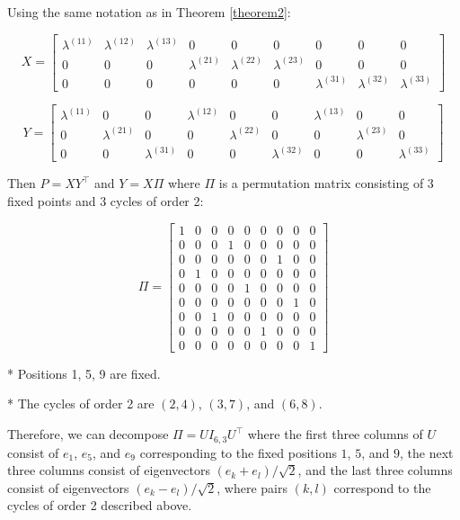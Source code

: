 \documentclass[
  11pt,
]{article}
\begin{document}
\begin{example}[$K = 3$] Using the same notation as in Theorem \ref{theorem2}:

$$X = \begin{bmatrix} 
\lambda^{(11)} & \lambda^{(12)} & \lambda^{(13)} & 0 & 0 & 0 & 0 & 0 & 0 \\
0 & 0 & 0 & \lambda^{(21)} & \lambda^{(22)} & \lambda^{(23)} & 0 & 0 & 0 \\
0 & 0 & 0 & 0 & 0 & 0 & \lambda^{(31)} & \lambda^{(32)} & \lambda^{(33)}
\end{bmatrix}$$

$$Y = \begin{bmatrix} 
\lambda^{(11)} & 0 & 0 & \lambda^{(12)} & 0 & 0 & \lambda^{(13)} & 0 & 0 \\
0 & \lambda^{(21)} & 0 & 0 & \lambda^{(22)} & 0 & 0 & \lambda^{(23)} & 0 \\
0 & 0 & \lambda^{(31)} & 0 & 0 & \lambda^{(32)} & 0 & 0 & \lambda^{(33)}
\end{bmatrix}$$

Then $P = X Y^\top$ and $Y = X \Pi$ where $\Pi$ is a permutation matrix 
consisting of $3$ fixed points and $3$ cycles of order 2:

$$\Pi = \begin{bmatrix} 
1 & 0 & 0 & 0 & 0 & 0 & 0 & 0 & 0 \\
0 & 0 & 0 & 1 & 0 & 0 & 0 & 0 & 0 \\
0 & 0 & 0 & 0 & 0 & 0 & 1 & 0 & 0 \\
0 & 1 & 0 & 0 & 0 & 0 & 0 & 0 & 0 \\
0 & 0 & 0 & 0 & 1 & 0 & 0 & 0 & 0 \\
0 & 0 & 0 & 0 & 0 & 0 & 0 & 1 & 0 \\
0 & 0 & 1 & 0 & 0 & 0 & 0 & 0 & 0 \\
0 & 0 & 0 & 0 & 0 & 1 & 0 & 0 & 0 \\
0 & 0 & 0 & 0 & 0 & 0 & 0 & 0 & 1
\end{bmatrix}$$

* Positions 1, 5, 9 are fixed.

* The cycles of order 2 are $(2, 4)$, $(3, 7)$, and $(6, 8)$.
    
Therefore, we can decompose $\Pi = U I_{6, 3} U^\top$ where the first three 
columns of $U$ consist of $e_1$, $e_5$, and $e_9$ corresponding to the fixed 
positions $1$, $5$, and $9$, the next three columns consist of eigenvectors 
$(e_k + e_l) / \sqrt{2}$, and the last three columns consist of eigenvectors 
$(e_k - e_l) / \sqrt{2}$, where pairs $(k, l)$ correspond to the cycles of 
order 2 described above.


\end{example}
\end{document}
